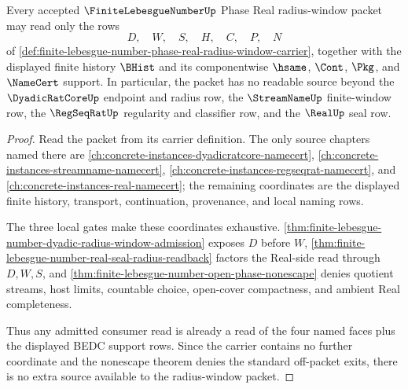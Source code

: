 \begin{theorem}
\label{thm:finite-lebesgue-number-phase-real-radius-window-no-extra-source}
Every accepted $\FiniteLebesgueNumberUp$ Phase Real radius-window packet may read only the rows
$$
D,\quad W,\quad S,\quad H,\quad C,\quad P,\quad N
$$
of \autoref{def:finite-lebesgue-number-phase-real-radius-window-carrier}, together with the displayed finite history $\BHist$ and its componentwise $\hsame$, $\Cont$, $\Pkg$, and $\NameCert$ support. In particular, the packet has no readable source beyond the $\DyadicRatCoreUp$ endpoint and radius row, the $\StreamNameUp$ finite-window row, the $\RegSeqRatUp$ regularity and classifier row, and the $\RealUp$ seal row.
\end{theorem}
\begin{proof}
Read the packet from its carrier definition. The only source chapters named there are \autoref{ch:concrete-instances-dyadicratcore-namecert}, \autoref{ch:concrete-instances-streamname-namecert}, \autoref{ch:concrete-instances-regseqrat-namecert}, and \autoref{ch:concrete-instances-real-namecert}; the remaining coordinates are the displayed finite history, transport, continuation, provenance, and local naming rows.

The three local gates make these coordinates exhaustive. \autoref{thm:finite-lebesgue-number-dyadic-radius-window-admission} exposes $D$ before $W$, \autoref{thm:finite-lebesgue-number-real-seal-radius-readback} factors the Real-side read through $D,W,S$, and \autoref{thm:finite-lebesgue-number-open-phase-nonescape} denies quotient streams, host limits, countable choice, open-cover compactness, and ambient Real completeness.

Thus any admitted consumer read is already a read of the four named faces plus the displayed BEDC support rows. Since the carrier contains no further coordinate and the nonescape theorem denies the standard off-packet exits, there is no extra source available to the radius-window packet.
\end{proof}

